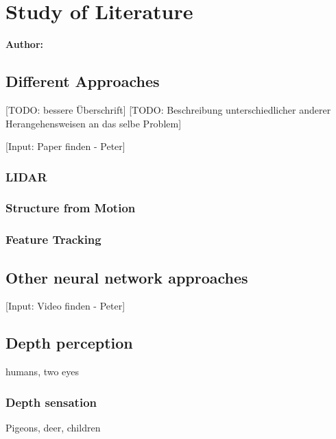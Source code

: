 \chapter{Study of Literature}

\textbf{Author: } 

\section{Different Approaches}
[TODO: bessere Überschrift]
[TODO: Beschreibung unterschiedlicher anderer Herangehensweisen an das selbe Problem]

[Input: Paper finden - Peter]

\subsection{LIDAR}

\subsection{Structure from Motion}

\subsection{Feature Tracking}

\section{Other neural network approaches}
[Input: Video finden - Peter]

\section{Depth perception}
humans, two eyes

\subsection{Depth sensation}
Pigeons, deer, children

\filbreak